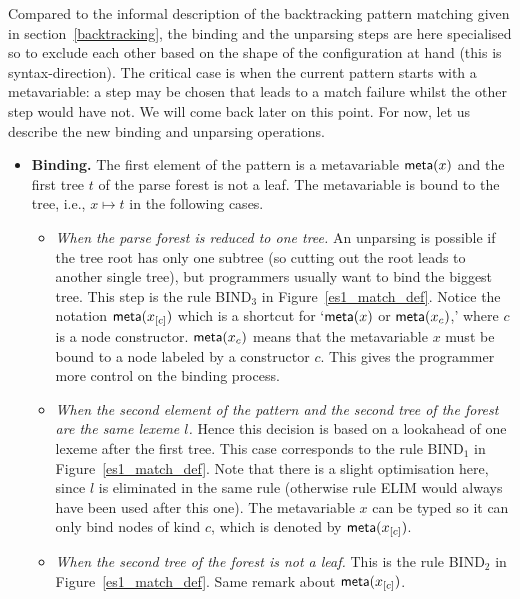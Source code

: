 Compared to the informal description of the backtracking pattern
matching given in section~\ref{backtracking}, the binding and the
unparsing steps are here specialised so to exclude each other based on
the shape of the configuration at hand (this is
syntax\hyp{}direction). The critical case is when the current pattern
starts with a meta\-variable: a step may be chosen that leads to a
match failure whilst the other step would have not. We will come back
later on this point. For now, let us describe the new binding and
unparsing operations.
\begin{itemize}

  \item \textbf{Binding.} The first element of the pattern is a
    meta\-variable \(\textsf{meta}(x)\) and the first tree \(t\) of the parse
    forest is not a leaf. The meta\-variable is bound to the tree,
    i.e., \(x \mapsto t\) in the following cases.
    \begin{itemize}

      \item \emph{When the parse forest is reduced to one tree.} An
        unparsing is possible if the tree root has only one subtree
        (so cutting out the root leads to another single tree), but
        programmers usually want to bind the biggest tree. This step
        is the rule \textsf{BIND}\(_3\) in
        Figure~\ref{es1_match_def}. Notice the notation
        \(\textsf{meta}(x_{[c]})\) which is a shortcut for `\(\textsf{meta}(x)\) or
        \(\textsf{meta}(x_{c})\),' where \(c\) is a node
        constructor. \(\textsf{meta}(x_{c})\) means that the meta\-variable
        \(x\) must be bound to a node labeled by a constructor
        \(c\). This gives the programmer more control on the binding
        process.

      \item \emph{When the second element of the pattern and the
        second tree of the forest are the same lexeme \(l\).} Hence
        this decision is based on a lookahead of one lexeme after the
        first tree. This case corresponds to the rule
        \textsf{BIND}\(_1\) in Figure~\ref{es1_match_def}. Note that
        there is a slight optimisation here, since \(l\) is eliminated
        in the same rule (otherwise rule \textsf{ELIM} would always
        have been used after this one). The meta\-variable \(x\) can
        be typed so it can only bind nodes of kind \(c\), which is
        denoted by \(\textsf{meta}(x_{[c]})\).

      \item \emph{When the second tree of the forest is not a leaf.}
        This is the rule \textsf{BIND}\(_2\) in
        Figure~\ref{es1_match_def}. Same remark about
        \(\textsf{meta}(x_{[c]})\).


\end{itemize}
\end{itemize}
